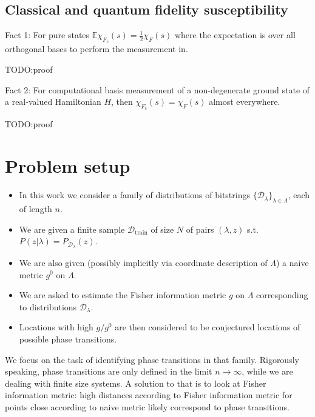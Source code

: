 \documentclass[
  american,aps,pra,reprint,floatfix,nofootinbib,superscriptaddress
]{revtex4-2}
\begin{document}
\subsection{Classical and quantum fidelity susceptibility}
Fact 1: For pure states $\mathbb{E}\chi_{F_c} (s) = \frac12 \chi_F (s)$
where the expectation is over all orthogonal bases to perform the measurement in.

TODO:proof

Fact 2: For computational basis measurement of a non-degenerate ground state
of a real-valued Hamiltonian $H$, then $\chi_{F_c}(s) = \chi_F(s)$
almost everywhere.

TODO:proof

\section{Problem setup}
\begin{itemize}
  \item In this work we consider a family of distributions of
bitstrings $\{\mathcal{D}_{\lambda}\}_{\lambda \in \Lambda}$, each of length $n$.
  \item We are given a finite sample $\mathcal{D}_{\textrm{train}}$ of size $N$
  of pairs $(\lambda, z)$ s.t. $P(z|\lambda) = P_{\mathcal{D}_{\lambda}}(z)$.
  \item We are also given (possibly implicitly via coordinate description of $\Lambda$) a naive metric $g^0$ on $\Lambda$.
  \item We are asked to estimate the Fisher information metric $g$ on $\Lambda$ corresponding to distributions $\mathcal{D}_{\lambda}$.
  \item Locations with high $g / g^0$ are then considered to be conjectured locations of possible phase transitions.
\end{itemize}

We focus on the task of identifying phase transitions in that
family. Rigorously speaking, phase transitions are only defined
in the limit $n\to\infty$, while we are dealing with finite size systems.
A solution to that is to look at Fisher information metric: high distances according to Fisher information metric for points close according to naive metric likely correspond to phase transitions.
\end{document}
